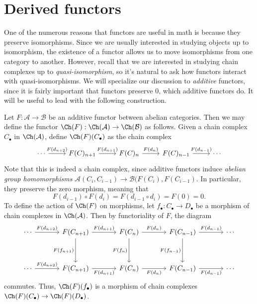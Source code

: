 \section{Derived functors}\label{sec7}

One of the numerous reasons that functors are useful in math is because they preserve isomorphisms. Since we are usually interested in studying objects up to isomorphism, the existence of a functor allows us to move isomorphisms from one category to another. However, recall that we are interested in studying chain complexes up to \emph{quasi-isomorphism}, so it's natural to ask how functors interact with quasi-isomorphisms. We will specialize our discussion to \emph{additive} functors, since it is fairly important that functors preserve 0, which additive functors do. It will be useful to lead with the following construction.

\begin{construction}\label{7.1}
	Let $F : \mathcal{A}  \to \mathcal{B} $ be an additive functor between abelian categories. Then we may define the functor $\Ch(F) : \Ch(\mathcal{A} )  \to \Ch(\mathcal{B} ) $ as follows. Given a chain complex $C_{\bullet} $ in $\Ch(\mathcal{A} ) $, define $\Ch(F) (C_{\bullet} )$ as the chain complex
	\[\begin{tikzcd}[row sep = 2.5em, column sep = 2.5em]
	\cdots\ar[" F(d_{n+2} ) ", r]  & F(C)_{n+1} \ar[" F(d_{n+1} ) ", r]  & F(C)_n\ar[" F(d_n) ", r]  & F(C)_{n-1} \ar[" F(d_{n-1} ) ", r]  & \cdots
	\end{tikzcd}\]
	Note that this is indeed a chain complex, since additive functors induce \emph{abelian group homomorphisms} $\mathcal{A} (C_i,C_{i-1} )\to \mathcal{B} (F(C_i),F(C_{i-1} )$. In particular, they preserve the zero morphism, meaning that
	\[
		F(d_{i-1} )\circ F(d_i)=F(d_{i-1} \circ d_i)=F(0)=0
	.\]
	To define the action of $\Ch(F)$ on morphisms, let $f_{\bullet} : C_{\bullet}  \to D_{\bullet} $ be a morphism of chain complexes in $\Ch(\mathcal{A} ) $. Then by functoriality of $F$, the diagram
	\[\begin{tikzcd}[row sep = 3.5em, column sep = 3.5em]
	\cdots \ar[" F(d_{n+2} ) ", r] & F(C_{n+1}) \ar[" F(d_{n+1} ) ", r] \ar[" F(f_{n+1} ) "', d]  & F(C_n)\ar[" F(d_n) ", r] \ar[" F(f_n) "', d]  & F(C_{n-1} )\ar[" F(f_{n-1} ) "', d] \ar[" F(d_{n-1} ) ", r]  & \cdots \\
	\cdots \ar[" F(d_{n+2} ) ", r] & F(C_{n+1} )\ar[" F(d_{n+1} ) "', r]  & F(C_n)\ar[" F(d_n) "', r]  & F(C_{n-1} )\ar[" F(d_{n-1} ) "', r]  & \cdots
	\end{tikzcd}\]
	commutes. Thus, $\Ch(F)(f_{\bullet} )$ is a morphism of chain complexes $\Ch(F)(C_{\bullet} )\to\Ch(F)(D_{\bullet} )$.
\end{construction}

